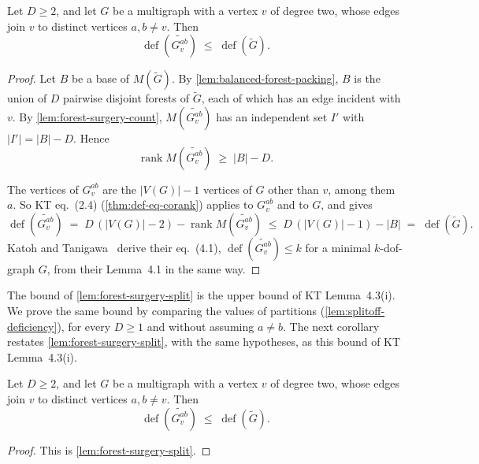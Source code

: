 \begin{lemma}
  \label{lem:forest-surgery-split}
  \leanok
  Let $D \ge 2$, and let $G$ be a multigraph with a vertex $v$ of degree
  two, whose edges join $v$ to distinct vertices $a, b \neq v$. Then
  \[
    \operatorname{def}(\widetilde{G_v^{ab}}) \;\le\;
    \operatorname{def}(\tilde G).
  \]
\end{lemma}
\begin{proof}
  \leanok
  Let $B$ be a base of $M(\tilde G)$. By
  \cref{lem:balanced-forest-packing}, $B$ is the union of $D$ pairwise
  disjoint forests of $\tilde G$, each of which has an edge incident with
  $v$. By \cref{lem:forest-surgery-count}, $M(\widetilde{G_v^{ab}})$ has
  an independent set $I'$ with $|I'| = |B| - D$. Hence
  \[
    \operatorname{rank} M(\widetilde{G_v^{ab}}) \;\ge\; |B| - D.
  \]

  The vertices of $G_v^{ab}$ are the $|V(G)| - 1$ vertices of $G$ other
  than $v$, among them $a$. So KT eq.~(2.4) (\cref{thm:def-eq-corank})
  applies to $G_v^{ab}$ and to $G$, and gives
  \[
    \operatorname{def}(\widetilde{G_v^{ab}}) \;=\;
    D\,(|V(G)| - 2) - \operatorname{rank} M(\widetilde{G_v^{ab}})
    \;\le\; D\,(|V(G)| - 1) - |B| \;=\; \operatorname{def}(\tilde G).
  \]
  Katoh and Tanigawa~\cite[p.~661]{katohTanigawa2011} derive their
  eq.~(4.1), $\operatorname{def}(\widetilde{G_v^{ab}}) \le k$ for a
  minimal $k$-dof-graph $G$, from their Lemma~4.1 in the same way.
\end{proof}

The bound of \cref{lem:forest-surgery-split} is the upper bound of KT
Lemma~4.3(i). We prove the same bound by comparing the values of
partitions (\cref{lem:splitoff-deficiency}), for every $D \ge 1$ and
without assuming $a \neq b$. The next corollary restates
\cref{lem:forest-surgery-split}, with the same hypotheses, as this bound
of KT Lemma~4.3(i).

\begin{corollary}
  \label{cor:forest-surgery-deficiency}
  \leanok
  Let $D \ge 2$, and let $G$ be a multigraph with a vertex $v$ of degree
  two, whose edges join $v$ to distinct vertices $a, b \neq v$. Then
  \[
    \operatorname{def}(\widetilde{G_v^{ab}}) \;\le\;
    \operatorname{def}(\tilde G).
  \]
\end{corollary}
\begin{proof}
  \leanok
  This is \cref{lem:forest-surgery-split}.
\end{proof}

